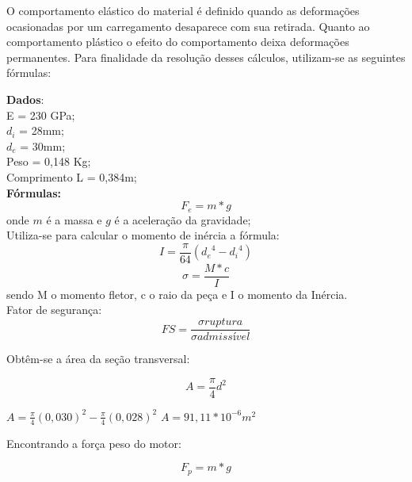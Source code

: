 O comportamento elástico do material é definido quando as deformações ocasionadas por um 
carregamento desaparece com sua retirada. Quanto ao comportamento plástico o efeito do 
comportamento deixa deformações permanentes. Para finalidade da resolução desses cálculos, 
utilizam-se as seguintes fórmulas:

\indent \textbf{Dados}:\\
   \indent E = 230 GPa;\\
   \indent $d_i$ = 28mm;\\
   \indent $d_e$ = 30mm;\\
   \indent Peso = 0,148 Kg;\\
   \indent Comprimento L = 0,384m;\\
\indent \textbf{Fórmulas:}
      \begin{equation}
	F_e = m * g
	\label{eq:11}
      \end{equation}
      \indent onde $m$ é a massa e $g$ é a aceleração da gravidade;\\
   \indent Utiliza-se para calcular o momento de inércia a fórmula:\\
      \begin{equation}
	I= \frac{\pi}{64}( {d_e}^4 - {d_i}^4)
	\label{eq:12}
    \end{equation}
      \begin{equation}
	 \sigma = \frac{M*c}{I}
	\label{eq:13}
      \end{equation}
    \indent sendo M o momento fletor, c o raio da peça e I o momento da Inércia.\\
    \indent Fator de segurança:
    \begin{equation}
     FS= \frac{\sigma ruptura}{\sigma admissível}
     \label{eq:14}
    \end{equation}

Obtêm-se a área da seção transversal:

\begin{equation}
 A= \frac{\pi}{4} {d} ^ {2}
\end{equation}

\begin{center}
 $ A= \frac{\pi}{4} ({0,030}) ^ {2} -  \frac{\pi}{4} ({0,028}) ^ {2}$
 $ A = 91,11 * {10} ^ {-6}   {m} ^ {2}$
\end{center}
Encontrando a força peso do motor:

\begin{equation}
 F_p = m * g 
\end{equation}

